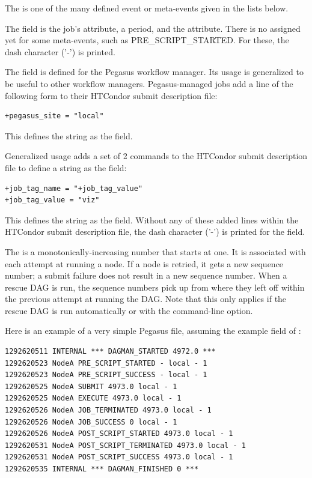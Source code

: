 \begin{description}
The  is one of the many defined event or meta-events given
in the lists below.

The  field is the job's 
 attribute, a period, and the  attribute. 
There is no  assigned yet for some meta-events,
such as PRE\_SCRIPT\_STARTED.
For these, the dash character ('-') is printed. 

The  field is defined for the Pegasus workflow manager.
Its usage is generalized to be useful to other workflow managers.
Pegasus-managed jobs add a line of the following form to their
HTCondor submit description file:
\begin{verbatim}
+pegasus_site = "local"
\end{verbatim}
This defines the string  as the  field.
 
Generalized usage adds a set of 2 commands to the HTCondor
submit description file to define a string as the  field:
\begin{verbatim}
+job_tag_name = "+job_tag_value"
+job_tag_value = "viz"
\end{verbatim}
This defines the string  as the  field.
Without any of these added lines within the HTCondor submit description file,
the dash character ('-') is printed for the  field. 

The  is a monotonically-increasing number 
that starts at one.
It is associated with each attempt at running a node.
If a node is retried, it gets a new sequence number;
a submit failure does not result in a new sequence number.
When a rescue DAG is run,
the sequence numbers pick up from where they left off within the previous
attempt at running the DAG.
Note that this only applies if the rescue
DAG is run automatically or with the  command-line option.

\end{description}

Here is an example of a very simple Pegasus  file,
assuming the example  field of :

\begin{verbatim}
1292620511 INTERNAL *** DAGMAN_STARTED 4972.0 ***
1292620523 NodeA PRE_SCRIPT_STARTED - local - 1
1292620523 NodeA PRE_SCRIPT_SUCCESS - local - 1
1292620525 NodeA SUBMIT 4973.0 local - 1
1292620525 NodeA EXECUTE 4973.0 local - 1
1292620526 NodeA JOB_TERMINATED 4973.0 local - 1
1292620526 NodeA JOB_SUCCESS 0 local - 1
1292620526 NodeA POST_SCRIPT_STARTED 4973.0 local - 1
1292620531 NodeA POST_SCRIPT_TERMINATED 4973.0 local - 1
1292620531 NodeA POST_SCRIPT_SUCCESS 4973.0 local - 1
1292620535 INTERNAL *** DAGMAN_FINISHED 0 ***
\end{verbatim}



